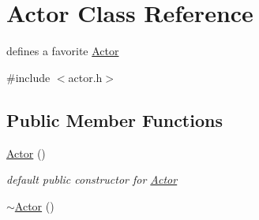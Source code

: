 \hypertarget{classActor}{}\section{Actor Class Reference}
\label{classActor}


defines a favorite \hyperlink{classActor}{Actor}  




{\ttfamily \#include $<$actor.\+h$>$}

\subsection*{Public Member Functions}
\begin{DoxyCompactItemize}
\item 
\hyperlink{classActor_a2a0ff4335a1ee9096df90f288c026c8b}{Actor} ()\hypertarget{classActor_a2a0ff4335a1ee9096df90f288c026c8b}{}\label{classActor_a2a0ff4335a1ee9096df90f288c026c8b}

\begin{DoxyCompactList}\small\item\em default public constructor for \hyperlink{classActor}{Actor} \end{DoxyCompactList}\item 
\hyperlink{classActor_ad807fe8f85e72ab263a0c05e3231cb39}{$\sim$\+Actor} ()\hypertarget{classActor_ad807fe8f85e72ab263a0c05e3231cb39}{}\label{classActor_ad807fe8f85e72ab263a0c05e3231cb39}


\end{DoxyCompactItemize}
